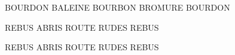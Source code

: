 \documentclass[french,a4paper,11pt]{article}
\begin{document}
{\begin{DemoCode}[]
\begin{GrilleSutom}[Unite=2,Police=\Huge\ttfamily,CouleurLettres=black]{BOURDON}
	BALEINE
	BOURBON
	BROMURE
	BOURDON
\end{GrilleSutom}
\end{DemoCode}

\begin{DemoCode}[]
\begin{GrilleSutom}%
		[Unite=0.75,Arrondi=0,Couleurs={cyan,orange,violet},%
		Style=alt,Lettres=false]{REBUS}
	ABRIS
	ROUTE
	RUDES
	REBUS
\end{GrilleSutom}
\hspace{5mm}
\begin{GrilleSutom}%
		[Unite=0.75,Arrondi=0,Couleurs={cyan,orange,violet},Style=alt]{REBUS}
	ABRIS
	ROUTE
	RUDES
	REBUS
\end{GrilleSutom}
\end{DemoCode}

}
\end{document}

